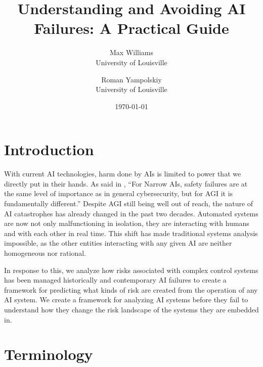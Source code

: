 \documentclass[11pt]{article}
\begin{document}
\title{Understanding and Avoiding AI Failures: A Practical Guide}
\author{Max Williams \\ University of Louisville \and Roman Yampolskiy \\ University of Louisville}
\date{\today}
\maketitle


\section{Introduction}

With current AI technologies, harm done by AIs is limited to power that we directly put in their
hands.  As said in \cite{yam2018historic}, ``For Narrow AIs, safety failures are at the same level
of importance as in general cybersecurity, but for AGI it is fundamentally different.'' Despite AGI
still being well out of reach, the nature of AI catastrophes has already changed in the past two
decades. Automated systems are now not only malfunctioning in isolation, they are interacting with
humans and with each other in real time. This shift has made traditional systems analysis impossible,
as the other entities interacting with any given AI are neither homogeneous nor rational.

In response to this, we analyze how risks associated with complex control systems has been managed
historically and contemporary AI failures to create a framework for predicting what kinds of risk
are created from the operation of any AI system. We create a framework for analyzing AI systems
before they fail to understand how they change the risk landscape of the systems they are embedded
in.

\section{Terminology}
\end{document}
